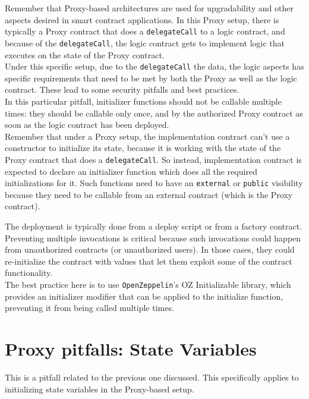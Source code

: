 Remember that Proxy-based architectures are used for upgradability and other aspects desired in smart contract applications. In this Proxy setup, there is typically a Proxy contract that does a \texttt{delegateCall} to a logic contract, and because of the \texttt{delegateCall}, the logic contract gets to implement logic that executes on the state of the Proxy contract.\\

Under this specific setup, due to the \texttt{delegateCall} the data, the logic aspects has specific requirements that need to be met by both the Proxy as well as the logic contract. These lead to some security pitfalls and best practices.\\

In this particular pitfall, initializer functions should not be callable multiple times: they should be callable only once, and by the authorized Proxy contract as soon as the logic contract has been deployed.\\

Remember that under a Proxy setup, the implementation contract can't use a constructor to initialize its state, because it is working with the state of the Proxy contract that does a \texttt{delegateCall}. So instead, implementation contract is expected to declare an initializer function which does all the required initializations for it. Such functions need to have an \texttt{external} or \texttt{public} visibility because they need to be callable from an external contract (which is the Proxy contract).

The deployment is typically done from a deploy script or from a factory contract. Preventing multiple invocations is critical because such invocations could happen from unauthorized contracts (or unauthorized users). In those cases, they could re-initialize the contract with values that let them exploit some of the contract functionality. \\

The best practice here is to use \texttt{OpenZeppelin}'s OZ Initializable library, which provides an initializer modifier that can be applied to the initialize function, preventing it from being called multiple times.

\section{Proxy pitfalls: State Variables}
This is a pitfall related to the previous one discussed. This specifically applies to initializing state variables in the Proxy-based setup. \\

